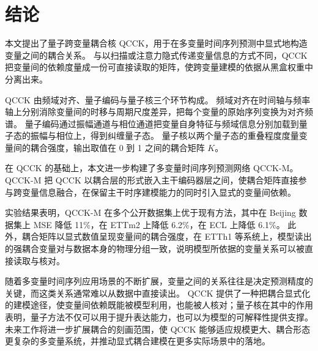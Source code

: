 
\section{结论}

本文提出了量子跨变量耦合核 QCCK，用于在多变量时间序列预测中显式地构造变量之间的耦合关系。
与以扫描或注意力隐式传递变量信息的方式不同，QCCK 把变量间的依赖度量成一份可直接读取的矩阵，使跨变量建模的依据从黑盒权重中分离出来。

QCCK 由频域对齐、量子编码与量子核三个环节构成。
频域对齐在时间轴与频率轴上分别消除变量间的时移与周期尺度差异，把每个变量的原始序列变换为对齐频谱。
量子编码通过振幅通道与相位通道把变量自身特征与频域信息分别加载到量子态的振幅与相位上，得到纠缠量子态。
量子核以两个量子态的重叠程度度量变量间的耦合强度，输出取值在 0 到 1 之间的耦合矩阵 $K$。

在 QCCK 的基础上，本文进一步构建了多变量时间序列预测网络 QCCK-M。
QCCK-M 把 QCCK 以耦合层的形式嵌入主干编码器层之间，使耦合矩阵直接参与跨变量信息融合，在保留主干时序建模能力的同时引入显式的变量间依赖。

实验结果表明，QCCK-M 在多个公开数据集上优于现有方法，其中在 Beijing 数据集上 MSE 降低 11\%，在 ETTm2 上降低 6.2\%，在 ECL 上降低 6.1\%。
此外，耦合矩阵以显式数值呈现变量间的耦合强度，在 ETTh1 等系统上，模型读出的强耦合变量对与数据本身的物理分组一致，说明模型所依据的变量关系可以被直接读取与核对。

随着多变量时间序列应用场景的不断扩展，变量之间的关系往往是决定预测精度的关键，而这类关系通常难以从数据中直接读出。
QCCK 提供了一种把耦合显式化的建模途径，使变量间依赖既能被模型利用，也能被人核对；量子核在其中的作用表明，量子方法不仅可以用于提升表达能力，也可以为模型的可解释性提供支撑。
未来工作将进一步扩展耦合的刻画范围，使 QCCK 能够适应规模更大、耦合形态更复杂的多变量系统，并推动显式耦合建模在更多实际场景中的落地。
